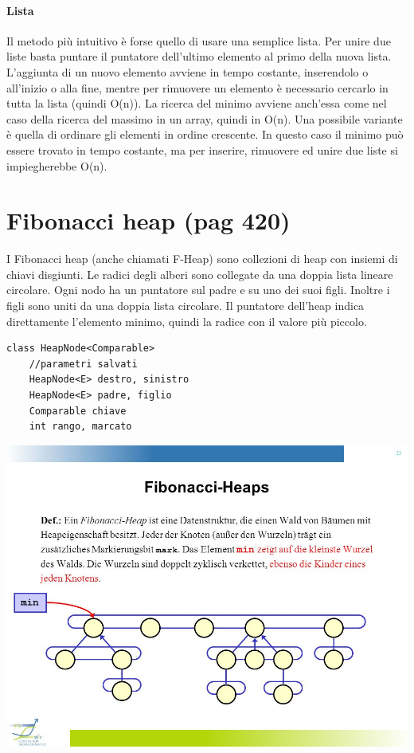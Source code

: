\documentclass[a4paper]{book}
\begin{document}
\paragraph*{Lista}
Il metodo più intuitivo è forse quello di usare una semplice lista. Per unire due liste basta puntare il puntatore dell'ultimo elemento al primo della nuova lista. L'aggiunta di un nuovo elemento avviene in tempo costante, inserendolo o all'inizio o alla fine, mentre per rimuovere un elemento è necessario cercarlo in tutta la lista (quindi O(n)). La ricerca del minimo avviene anch'essa come nel caso della ricerca del massimo in un array, quindi in O(n). Una possibile variante è quella di ordinare gli elementi in ordine crescente. In questo caso il minimo può essere trovato in tempo costante, ma per inserire, rimuovere ed unire due liste si impiegherebbe O(n).
\section{Fibonacci heap (pag 420)}
I Fibonacci heap (anche chiamati F-Heap) sono collezioni di heap con insiemi di chiavi disgiunti. Le radici degli alberi sono collegate da una doppia lista lineare circolare. Ogni nodo ha un puntatore sul padre e su uno dei suoi figli. Inoltre i figli sono uniti da una doppia lista circolare. Il puntatore dell'heap indica direttamente l'elemento minimo, quindi la radice con il valore più piccolo.
\begin{lstlisting}
class HeapNode<Comparable>
	//parametri salvati
	HeapNode<E> destro, sinistro
	HeapNode<E> padre, figlio
	Comparable chiave
	int rango, marcato
\end{lstlisting}
\begin{center}
\includegraphics[scale=0.5]{Figures/fheap.jpg}
\end{center}
\end{document}
